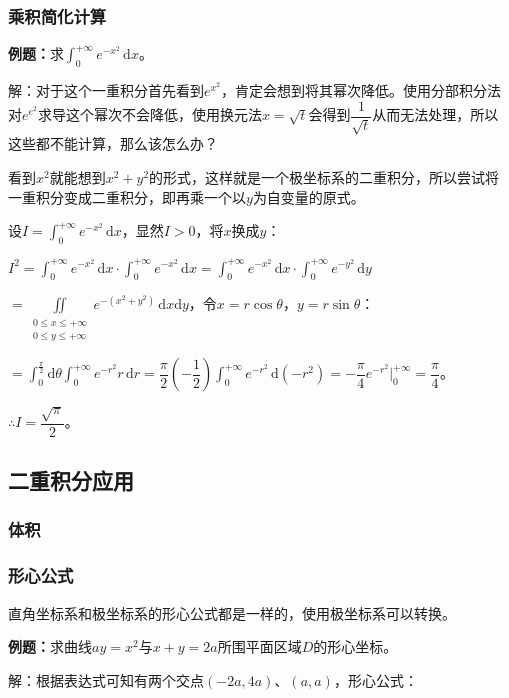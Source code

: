 \subsubsection{乘积简化计算}

\textbf{例题：}求$\int_0^{+\infty}e^{-x^2}\,\textrm{d}x$。

解：对于这个一重积分首先看到$e^{x^2}$，肯定会想到将其幂次降低。使用分部积分法对$e^{e^2}$求导这个幂次不会降低，使用换元法$x=\sqrt{t}$会得到$\dfrac{1}{\sqrt{t}}$从而无法处理，所以这些都不能计算，那么该怎么办？

看到$x^2$就能想到$x^2+y^2$的形式，这样就是一个极坐标系的二重积分，所以尝试将一重积分变成二重积分，即再乘一个以$y$为自变量的原式。

设$I=\int_0^{+\infty}e^{-x^2}\,\textrm{d}x$，显然$I>0$，将$x$换成$y$：

$I^2=\int_0^{+\infty}e^{-x^2}\,\textrm{d}x\cdot\int_0^{+\infty}e^{-x^2}\,\textrm{d}x=\int_0^{+\infty}e^{-x^2}\,\textrm{d}x\cdot\int_0^{+\infty}e^{-y^2}\,\textrm{d}y$

$=\displaystyle{\iint\limits_{\substack{0\leqslant x\leqslant+\infty\\0\leqslant y\leqslant+\infty}}e^{-(x^2+y^2)}\,\textrm{d}x\textrm{d}y}$，令$x=r\cos\theta$，$y=r\sin\theta$：

$=\displaystyle{\int_0^\frac{\pi}{2}\textrm{d}\theta\int_0^{+\infty}e^{-r^2}r\,\textrm{d}r=\dfrac{\pi}{2}\left(-\dfrac{1}{2}\right)\int_0^{+\infty}e^{-r^2}\,\textrm{d}(-r^2)=-\dfrac{\pi}{4}e^{-r^2}\bigg\vert_0^{+\infty}}=\dfrac{\pi}{4}$。

$\therefore I=\dfrac{\sqrt{\pi}}{2}$。

\subsection{二重积分应用}

\subsubsection{体积}

\subsubsection{形心公式}

直角坐标系和极坐标系的形心公式都是一样的，使用极坐标系可以转换。

\textbf{例题：}求曲线$ay=x^2$与$x+y=2a$所围平面区域$D$的形心坐标。

解：根据表达式可知有两个交点$(-2a,4a)$、$(a,a)$，形心公式：

